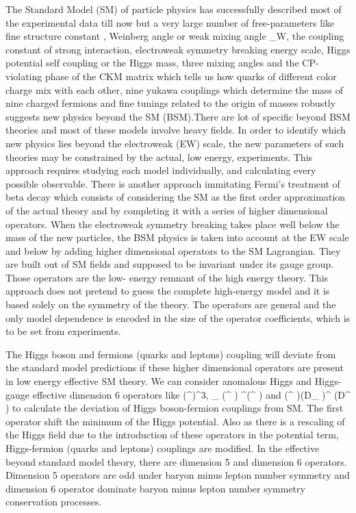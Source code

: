 \documentclass[final,3p]{CSP}
\begin{document}
The Standard Model (SM) of particle physics has successfully described most of the experimental data till now but a very large number of
free-parameters like fine structure constant \alpha, Weinberg angle or weak mixing angle \theta_W, the coupling constant of strong 
interaction, electroweak symmetry breaking energy scale, Higgs potential self coupling or the Higgs mass, three mixing angles and the 
CP-violating phase of the CKM matrix which tells us how quarks of different color charge mix with each other, nine yukawa couplings 
which determine the mass of nine charged fermions and fine tunings related to the origin of masses robustly suggests new physics beyond 
the SM (BSM).There are lot of specific beyond BSM theories and most of these models involve heavy fields. In order to identify which new 
physics lies beyond the electroweak (EW) scale, the new parameters of such theories may be constrained by the actual, low energy, 
experiments. This approach requires studying each model individually, and calculating every possible observable. There is another 
approach immitating Fermi’s treatment of beta decay which consists of considering the SM as the first order approximation of the actual 
theory and by completing it with a series of higher dimensional operators. When the electroweak symmetry breaking takes place well below 
the mass of the new particles, the BSM physics is taken into account at the EW scale and below by adding higher dimensional operators to 
the SM Lagrangian. They are built out of SM fields and supposed to be invariant under its gauge group. Those operators are the low-
energy remnant of the high energy theory. This approach does not pretend to guess the complete high-energy model and it is based solely 
on the symmetry of the  theory. The operators are general and the only model dependence is encoded in the size of the operator 
coefficients, which is to be set from experiments. 

The Higgs boson and fermions (quarks and leptons) coupling will deviate from the standard model predictions if these higher dimensional 
operators are present in low energy effective SM theory. We can consider anomalous Higgs and Higgs-gauge effective dimension 6 operators 
like (\phi^{\dagger}\phi)^3,  \partial_{\mu} (\phi^{\dagger} \phi) \partial^{\mu}(\phi^{\dagger} \phi) and 
(\phi^{\dagger} \phi)(D_{\mu} \phi)^{\dagger} (D^{\mu} \phi) to calculate the deviation of Higgs boson-fermion couplings from SM. The 
first operator shift the minimum of the Higgs potential. Also as there is a rescaling of the Higgs field due to the introduction of 
these operators in the potential term, Higgs-fermion (quarks and leptons) couplings are modified. In the effective beyond standard model 
theory, there are dimension 5 and dimension 6 operators. Dimension 5 operators are odd under baryon minus lepton number symmetry and 
dimension 6 operator dominate baryon minus lepton number symmetry conservation processes. 
\end{document}
